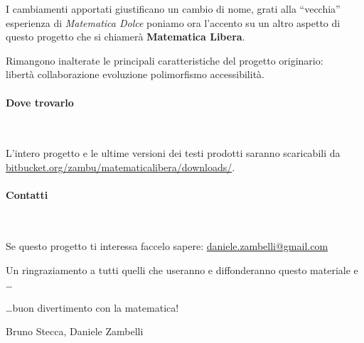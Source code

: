 I cambiamenti apportati giustificano un cambio di nome, 
grati alla ``vecchia'' esperienza di \emph{Matematica Dolce} 
poniamo ora l'accento su un altro aspetto di questo progetto che si 
chiamerà \textbf{Matematica Libera}.

Rimangono inalterate le principali caratteristiche del progetto 
originario:\\[.5em]
{\Large \centering
libertà \quad collaborazione \quad evoluzione \quad polimorfismo \quad
accessibilità.
}

\paragraph {Dove trovarlo}~

L'intero progetto e le ultime versioni dei testi prodotti saranno 
scaricabili da 
\href{https://bitbucket.org/zambu/matematicalibera/downloads/}
{bitbucket.org/zambu/matematicalibera/downloads/}.

\paragraph {Contatti}~

Se questo progetto ti interessa faccelo sapere: 
\href{mailto:daniele.zambelli@gmail.com}{daniele.zambelli@gmail.com}

\vspace{2em}
Un ringraziamento a tutti quelli che useranno e diffonderanno questo 
materiale e
\dots

\dots buon divertimento con la matematica!
\begin{flushright}
Bruno Stecca, Daniele Zambelli
\end{flushright}
